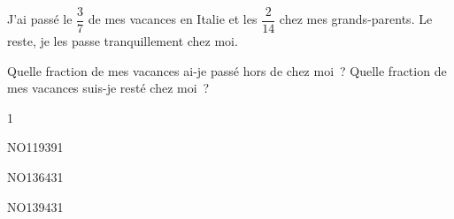 \documentclass[a4paper,11pt]{report}
\begin{document}
\begin{exo}
	{\vspace{0.5em}

		J'ai passé le $\dfrac{3}{7}$ de mes vacances en Italie et les $\dfrac{2}{14}$ chez mes grands-parents. Le reste, je les passe tranquillement chez moi.

		\begin{tasks}[after-item-skip = 0.2em]
    \task Quelle fraction de mes vacances ai-je passé hors de chez moi~?
    \task Quelle fraction de mes vacances suis-je resté chez moi~?
\end{tasks}}
{1}
\end{exo}


\begin{exol}{NO119}{39}{1}
\end{exol}
\begin{exol}{NO136}{43}{1}
\end{exol}
\begin{exol}{NO139}{43}{1}
\end{exol}
\end{document}
